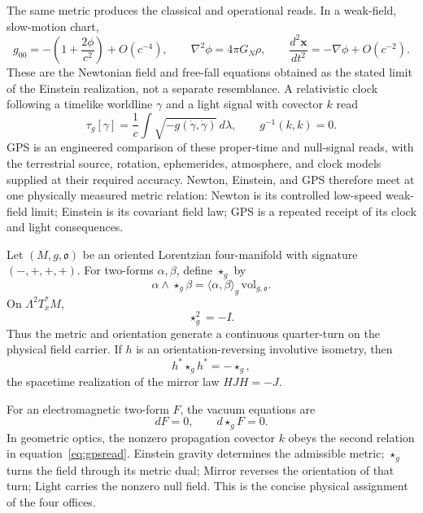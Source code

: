 \documentclass[10pt]{article}
\begin{document}
The same metric produces the classical and operational reads. In a
weak-field, slow-motion chart,
\begin{equation}
g_{00}=-\left(1+\frac{2\phi}{c^2}\right)+O(c^{-4}),
\qquad
\nabla^2\phi=4\pi G_N\rho,
\qquad
\frac{d^2\mathbf x}{dt^2}=-\nabla\phi+O(c^{-2}).
\label{eq:newtonlimit}
\end{equation}
These are the Newtonian field and free-fall equations obtained as the stated
limit of the Einstein realization, not a separate resemblance. A relativistic
clock following a timelike worldline $\gamma$ and a light signal with covector
$k$ read
\begin{equation}
\boxed{
\tau_g[\gamma]=\frac1c\int
\sqrt{-g(\dot\gamma,\dot\gamma)}\,d\lambda,
\qquad g^{-1}(k,k)=0.}
\label{eq:gpsread}
\end{equation}
GPS is an engineered comparison of these proper-time and null-signal reads,
with the terrestrial source, rotation, ephemerides, atmosphere, and clock
models supplied at their required accuracy. Newton, Einstein, and GPS
therefore meet at one physically measured metric relation: Newton is its
controlled low-speed weak-field limit; Einstein is its covariant field law;
GPS is a repeated receipt of its clock and light consequences.

Let $(M,g,\mathfrak o)$ be an oriented Lorentzian four-manifold with signature
$(-,+,+,+)$.  For two-forms $\alpha,\beta$, define $\star_g$ by
\begin{equation}
\alpha\wedge\star_g\beta
=\langle\alpha,\beta\rangle_g\,\mathrm{vol}_{g,\mathfrak o}.
\end{equation}
On $\Lambda^2T_x^*M$,
\begin{equation}
\boxed{\star_g^2=-I.}
\label{eq:hodgeturn}
\end{equation}
Thus the metric and orientation generate a continuous quarter-turn on the
physical field carrier. If $h$ is an orientation-reversing involutive
isometry, then
\begin{equation}
\boxed{h^*\star_g h^*=-\star_g,}
\label{eq:hodgemirror}
\end{equation}
the spacetime realization of the mirror law $HJH=-J$.

For an electromagnetic two-form $F$, the vacuum equations are
\begin{equation}
\boxed{dF=0,\qquad d\star_gF=0.}
\label{eq:maxwellhodge}
\end{equation}
In geometric optics, the nonzero propagation covector $k$ obeys the second
relation in equation~\eqref{eq:gpsread}. Einstein gravity determines the
admissible metric; $\star_g$ turns the
field through its metric dual; Mirror reverses the orientation of that turn;
Light carries the nonzero null field. This is the concise physical assignment
of the four offices.
\end{document}
